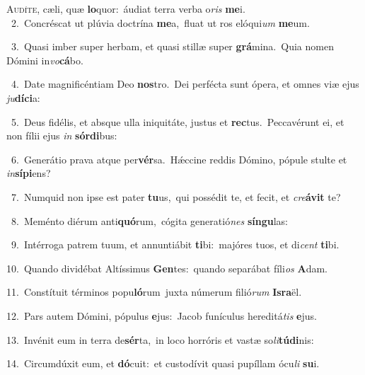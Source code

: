 \lettrine{\initial\textcolor{\initialcolor}{A}}{udíte,} cæli, quæ \textbf{lo}\-quor:~\star áudiat terra verba o\textit{ris} \textbf{me}\-i.\\
{\numbfont\textcolor{\numbcolor}{~2.}}~Concréscat ut plúvia doctrína \textbf{me}\-a,~\star fluat ut ros elóqui\textit{um} \textbf{me}\-um.\par
{\numbfont\textcolor{\numbcolor}{~3.}}~Quasi imber super herbam, et quasi stillæ super \textbf{grá}\-mina.~\star Quia nomen Dómini in\-\textit{vo}\-\textbf{cá}bo.\par
{\numbfont\textcolor{\numbcolor}{~4.}}~Date magnificéntiam Deo \textbf{nos}\-tro.~\star Dei perfécta sunt ópera, et omnes viæ ejus \textit{ju}\-\textbf{dí}\textbf{ci}a:\par
{\numbfont\textcolor{\numbcolor}{~5.}}~Deus fidélis, et absque ulla iniquitáte, justus et \textbf{rec}\-tus.~\star Peccavérunt ei, et non fílii ejus \textit{in} \textbf{sór}\-\textbf{di}bus:\par
{\numbfont\textcolor{\numbcolor}{~6.}}~Generátio prava atque per\-\textbf{vér}\-sa.~\star Hǽccine reddis Dómino, pópule stulte et \textit{in}\-\textbf{sí}\textbf{pi}ens?\par
{\numbfont\textcolor{\numbcolor}{~7.}}~Numquid non ipse est pater \textbf{tu}\-us,~\star qui possédit te, et fecit, et \textit{cre}\-\textbf{á}\textbf{vit} te?\par
{\numbfont\textcolor{\numbcolor}{~8.}}~Meménto diérum anti\-\textbf{quó}\-rum,~\star cógita generatió\textit{nes} \textbf{sín}\-\textbf{gu}las:\par
{\numbfont\textcolor{\numbcolor}{~9.}}~Intérroga patrem tuum, et annuntiábit \textbf{ti}\-bi:~\star majóres tuos, et di\textit{cent} \textbf{ti}\-bi.\par
{\numbfont\textcolor{\numbcolor}{10.}}~Quando dividébat Altíssimus \textbf{Gen}\-tes:~\star quando separábat fíli\textit{os} \textbf{A}\-dam.\par
{\numbfont\textcolor{\numbcolor}{11.}}~Constítuit términos popu\-\textbf{ló}\-rum~\star juxta númerum filió\textit{rum} \textbf{Is}\-\textbf{ra}ël.\par
{\numbfont\textcolor{\numbcolor}{12.}}~Pars autem Dómini, pópulus \textbf{e}\-jus:~\star Jacob funículus hereditá\textit{tis} \textbf{e}\-jus.\par
{\numbfont\textcolor{\numbcolor}{13.}}~Invénit eum in terra de\-\textbf{sér}\-ta,~\star in loco horróris et vastæ so\-\textit{li}\-\textbf{tú}\textbf{di}nis:\par
{\numbfont\textcolor{\numbcolor}{14.}}~Circumdúxit eum, et \textbf{dó}\-cuit:~\star et custodívit quasi pupíllam ócu\textit{li} \textbf{su}\-i.\par
